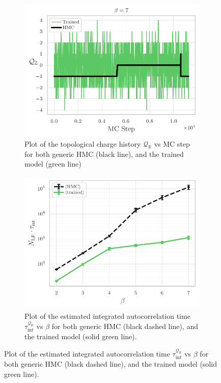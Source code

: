 \documentclass{article} %
\begin{document}
\begin{figure}[htpb]
   \centering
   \begin{subfigure}{0.48\textwidth}
      \includegraphics[width=\textwidth]{figures/topological_freezing_green.pdf}
      \caption{\label{fig:topological_freezing}Plot of the topological charge history \(\mathcal{Q}_{\mathbb{R}}\) vs MC
      step for both generic HMC (black line), and the trained model (green line)}
   \end{subfigure}
   \hfill
   \begin{subfigure}{0.48\textwidth}
      \includegraphics[width=\textwidth]{figures/autocorr_vs_beta.pdf}
      \caption{\label{fig:autocorr_vs_beta}Plot of the estimated integrated autocorrelation time \(\tau_{\mathrm{int}}^{\mathcal{Q}_{\mathbb{R}}}\)
      vs \(\beta\) for both generic HMC (black dashed line), and the trained model (solid green line).}
   \end{subfigure}
\end{figure}
%
\end{document}
